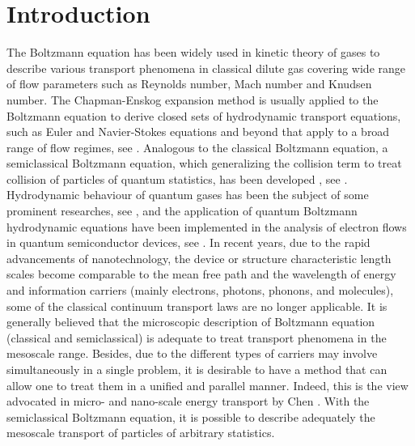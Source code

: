 \documentclass{rsproca}%
\begin{document}



\maketitle

\section{Introduction}
\label{sec:1}

 The Boltzmann equation has been widely used in kinetic theory of gases to describe various transport phenomena in classical dilute gas covering wide range of flow parameters such as Reynolds number, Mach number and Knudsen number.   The Chapman-Enskog expansion method is usually applied to the Boltzmann equation to derive closed sets of hydrodynamic transport equations, such as Euler and Navier-Stokes equations and beyond that apply to a broad range of flow regimes, see \cite{Chapman1990}.  Analogous to the classical Boltzmann equation, a semiclassical Boltzmann equation, which generalizing the collision term to treat collision of particles of quantum statistics, has been developed \cite{PhysRev.43.552}, see \cite{KadanoffBaym,PhysRev.43.552}.   Hydrodynamic behaviour of quantum gases has been the subject of some prominent researches, see \cite{nikuni98,PhysRev.40.749,PhysRevB.35.7959}, and the application of quantum Boltzmann hydrodynamic equations have been implemented in the analysis of electron flows in quantum semiconductor devices, see \cite{Gardner1994,PhysRevB.39.9536,Woolard5146296}.
In recent years, due to the rapid advancements of nanotechnology, the device or structure characteristic length scales become comparable to the mean free path and the wavelength of energy and information carriers (mainly electrons, photons, phonons, and molecules), some of the classical continuum transport laws are no longer applicable.   It is generally believed that the microscopic description of Boltzmann equation (classical and semiclassical) is adequate to treat transport phenomena in the mesoscale range.  Besides, due to the different types of carriers may involve simultaneously in a single problem, it is desirable to have a method that can allow one to treat them in a unified and parallel manner.   Indeed, this is the view advocated in micro- and nano-scale energy transport by Chen \cite{GChen2005}.   With the semiclassical Boltzmann equation, it is possible to describe adequately the mesoscale transport of particles of arbitrary statistics.
\end{document}
